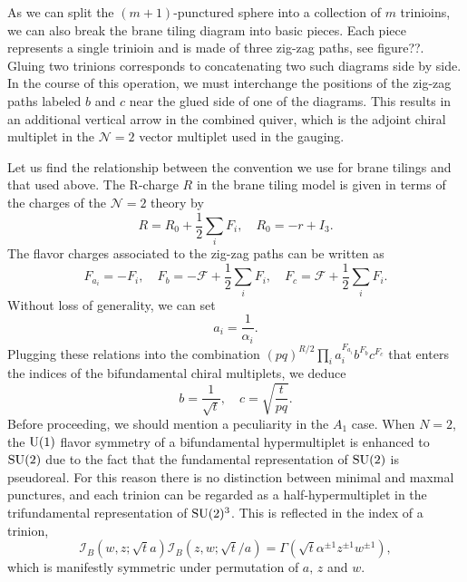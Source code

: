 As we can split the $(m+1)$-punctured sphere into a collection of
$m$ trinioins, we can also break the brane tiling diagram into basic
pieces. Each piece represents a single trinioin and is made of three
zig-zag paths, see figure??. Gluing two trinions corresponds to concatenating
two such diagrams side by side. In the course of this operation, we
must interchange the positions of the zig-zag paths labeled $b$ and
$c$ near the glued side of one of the diagrams. This results in an
additional vertical arrow in the combined quiver, which is the adjoint
chiral multiplet in the $\mathcal{N}=2$ vector multiplet used in
the gauging.

Let us find the relationship between the convention we use for brane
tilings and that used above. The R-charge $R$ in the brane tiling
model is given in terms of the charges of the $\mathcal{N}=2$ theory
by 
\begin{equation}
    R  =  R_{0}  +  \frac{1}{2}\sum_{i}F_{i},  
      \quad  R_{0}  =  -r+I_{3}.
\end{equation}
 The flavor charges associated to the zig-zag paths can be written
as 
\begin{equation}
    F_{a_{i}}  =  -F_{i},  
      \quad  F_{b}  =  -\mathcal{F}+\frac{1}{2}\sum_{i}F_{i},  
      \quad  F_{c}  =  \mathcal{F}+\frac{1}{2}\sum_{i}F_{i}.
\end{equation}
Without loss of generality, we can set
\begin{equation}
    a_{i}  =  \frac{1}{\alpha_{i}}.
\end{equation}
Plugging these relations into the combination $(pq)^{R/2}\prod_{i}a_{i}^{F_{a_{i}}}b^{F_{b}}c^{F_{c}}$
that enters the indices of the bifundamental chiral multiplets, we
deduce
\begin{equation}
    b  =  \frac{1}{\sqrt{t}},  
      \quad  c  =  \sqrt{\frac{t}{pq}}.  \label{eq:relation_bc}
\end{equation}
Before proceeding, we should mention a peculiarity in the $A_{1}$
case. When $N=2$, the $\mathrm{U}(1)$ flavor symmetry of a bifundamental hypermultiplet
is enhanced to $\mathrm{SU}(2)$ due to the fact that the fundamental representation
of $\mathrm{SU}(2)$ is pseudoreal. For this reason there is no distinction
between minimal and maxmal punctures, and each trinion can be regarded
as a half-hypermultiplet in the trifundamental representation of $\mathrm{SU}(2)^{3}$.
This is reflected in the index of a trinion, 
\begin{equation}
    \mathcal{I}_{B}(w,z;\sqrt{t}a)\mathcal{I}_{B}(z,w;\sqrt{t}/a)  
      =  
        \Gamma(\sqrt{t}\alpha^{\pm1}z^{\pm1}w^{\pm1}),
\end{equation}
which is manifestly symmetric under permutation of $a,\,z$ and $w$. 





